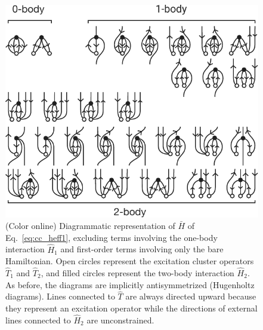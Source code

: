 \begin{figure}
  \includegraphics{fig-diagrams-ccsd.pdf}
  \caption{(Color online) Diagrammatic representation of $\bar{H}$ of Eq.\ \eqref{eq:cc_heff1}, excluding terms involving the one-body interaction $\hat{H}_1$ and first-order terms involving only the bare Hamiltonian. Open circles represent the excitation cluster operators $\hat{T}_1$ and $\hat{T}_2$, and filled circles represent the two-body interaction $\hat{H}_2$.  As before, the diagrams are implicitly antisymmetrized (Hugenholtz diagrams).  Lines connected to $\hat{T}$ are always directed upward because they represent an excitation operator while the directions of external lines connected to $\hat{H}_2$ are unconstrained. }
  \label{fig:diagrams-ccsd}
\end{figure}

